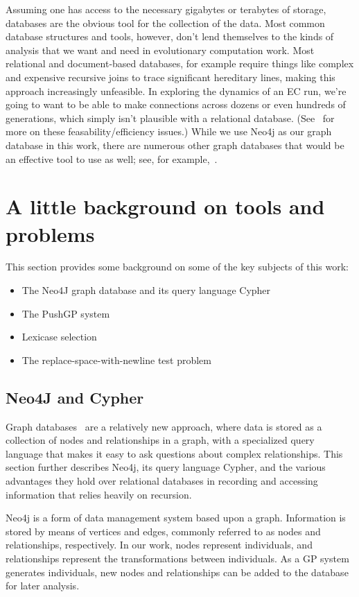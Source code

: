 Assuming one has access to the necessary gigabytes or terabytes of storage, 
databases are the obvious tool for the collection of the data. Most common database structures and tools,
however,
don't lend themselves to the kinds of analysis that we want and need in evolutionary computation work. 
Most relational and document-based databases, for example require things like complex and expensive 
recursive joins to trace significant hereditary lines, making this approach increasingly unfeasible.
In exploring the dynamics of an EC run, we're going to want to be able to
make connections across dozens or even hundreds of generations, which simply isn't plausible with a
relational database. (See~\cite{Robinson:GraphDB:Book} for more on these 
feasability/efficiency issues.) While we use Neo4j as our graph database in this work, there are 
numerous other 
graph databases that would be an effective tool to use as well; see, for example,~\cite{wiki:GraphDB}. 

\section{A little background on tools and problems}

This section provides some background on some of the key subjects of this work:
\begin{itemize}
	\item The Neo4J graph database and its query language Cypher
	\item The PushGP system
	\item Lexicase selection
	\item The replace-space-with-newline test problem
\end{itemize} 

\subsection{Neo4J and Cypher}
\label{subsec:Neo4j}

Graph databases~\cite{Robinson:GraphDB:Book} are a relatively new approach, where data is stored 
as a collection of nodes and relationships in a graph, with a specialized query language that makes 
it easy to ask questions about complex relationships. This section further describes Neo4j, its query 
language Cypher, and the various advantages they hold over relational databases in recording and 
accessing information that relies heavily on recursion.

Neo4j is a form of data management system based upon a graph. Information is stored by means of 
vertices and edges, commonly referred to as nodes and relationships, 
respectively. In our work, nodes represent individuals, and relationships represent the 
transformations between individuals. As a GP system generates individuals, new nodes and 
relationships can be added to the database for later analysis.


